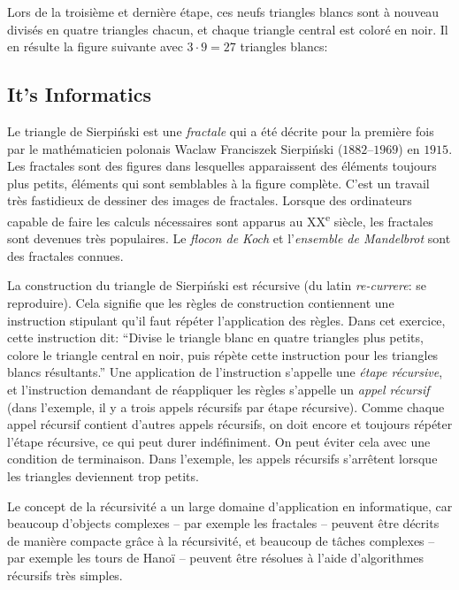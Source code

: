 \documentclass[a4paper,11pt]{report}
\newcommand{\taskGraphicsFolder}{..}
\begin{document}
{\centering%
\par}

Lors de la troisième et dernière étape, ces neufs triangles blancs sont à nouveau divisés en quatre triangles chacun, et chaque triangle central est coloré en noir. Il en résulte la figure suivante avec  ${3 \cdot 9 = 27}$ triangles blancs:

{\centering%
\par}


\subsection*{It’s Informatics}

Le triangle de Sierpiński est une \emph{fractale} qui a été décrite pour la première fois par le mathématicien polonais Waclaw Franciszek Sierpiński ($1882$–$1969$) en $1915$. Les fractales sont des figures dans lesquelles apparaissent des éléments toujours plus petits, éléments qui sont semblables à la figure complète. C’est un travail très fastidieux de dessiner des images de fractales. Lorsque des ordinateurs capable de faire les calculs nécessaires sont apparus au XX\textsuperscript{e} siècle, les fractales sont devenues très populaires. Le \emph{flocon de Koch} et l’\emph{ensemble de Mandelbrot} sont des fractales connues.

La construction du triangle de Sierpiński est récursive (du latin \emph{re-currere}: se reproduire). Cela signifie que les règles de construction contiennent une instruction stipulant qu’il faut répéter l’application des règles. Dans cet exercice, cette instruction dit: “Divise le triangle blanc en quatre triangles plus petits, colore le triangle central en noir, puis répète cette instruction pour les triangles blancs résultants.” Une application de l’instruction s’appelle une \emph{étape récursive}, et l’instruction demandant de réappliquer les règles s’appelle un \emph{appel récursif} (dans l’exemple, il y a trois appels récursifs par étape récursive). Comme chaque appel récursif contient d’autres appels récursifs, on doit encore et toujours répéter l’étape récursive, ce qui peut durer indéfiniment. On peut éviter cela avec une condition de terminaison. Dans l’exemple, les appels récursifs s’arrêtent lorsque les triangles deviennent trop petits.

Le concept de la récursivité a un large domaine d’application en informatique, car beaucoup d’objects complexes – par exemple les fractales – peuvent être décrits de manière compacte grâce à la récursivité, et beaucoup de tâches complexes – par exemple les tours de Hanoï – peuvent être résolues à l’aide d’algorithmes récursifs très simples.
\end{document}
